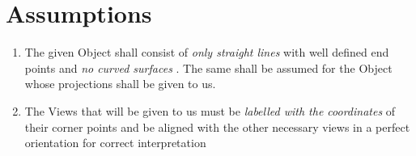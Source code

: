 \documentclass[12pt]{report}
\begin{document}
\chapter{Assumptions}

\begin{enumerate}
    \item 
  The given Object shall consist of \textit{ only straight lines } with well defined end points and \textit{ no curved surfaces } . The same shall be assumed for the Object whose projections shall be given to us.
    \item 
  The Views that will be given to us must be \textit{ labelled with the coordinates } of their corner points and be aligned with the other necessary views in a perfect orientation for correct interpretation
\end{enumerate}
\end{document}
